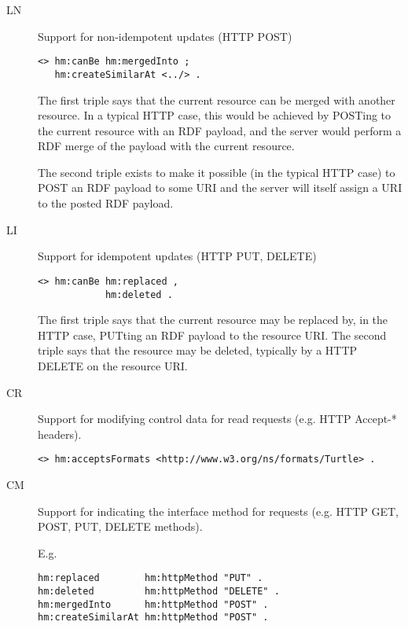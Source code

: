 \documentclass{llncs}
\begin{document}
\begin{description}

\item[\textsf{LN}] Support for non-idempotent updates (HTTP POST) 

\begin{verbatim}
<> hm:canBe hm:mergedInto ;
   hm:createSimilarAt <../> .
\end{verbatim}

The first triple says that the current resource can be merged with
another resource. In a typical HTTP case, this would be achieved by
POSTing to the current resource with an RDF payload, and the server
would perform a RDF merge of the payload with the current resource.

The second triple exists to make it possible (in the typical HTTP
case) to POST an RDF payload to some URI and the server will itself
assign a URI to the posted RDF payload. 


\item[\textsf{LI}] Support for idempotent updates (HTTP PUT, DELETE) 

\begin{verbatim}
<> hm:canBe hm:replaced ,
            hm:deleted .
\end{verbatim}

The first triple says that the current resource may be replaced by, in
the HTTP case, PUTting an RDF payload to the resource URI. The second
triple says that the resource may be deleted, typically by a HTTP
DELETE on the resource URI.


\item[\textsf{CR}] Support for modifying control data for read requests
  (e.g. HTTP Accept-* headers).

\begin{verbatim}
<> hm:acceptsFormats <http://www.w3.org/ns/formats/Turtle> .
\end{verbatim}

\item[\textsf{CM}] Support for indicating the interface method for requests
  (e.g. HTTP GET, POST, PUT, DELETE methods).

E.g.

\begin{verbatim}
hm:replaced        hm:httpMethod "PUT" .
hm:deleted         hm:httpMethod "DELETE" .
hm:mergedInto      hm:httpMethod "POST" .
hm:createSimilarAt hm:httpMethod "POST" .
\end{verbatim}

\end{description}
\end{document}
